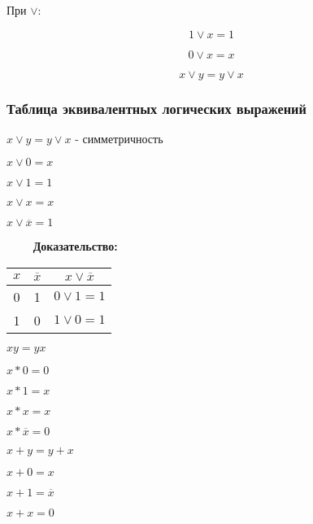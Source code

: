 \documentclass[russian]{lecture-notes}
\begin{document}
\begin{sloppypar}
\begin{proposition*}
        \end{proposition*}

        \begin{proposition*}
            При $\lor$:

            $$1 \lor x = 1$$

            $$0 \lor x = x$$

            $$x \lor y = y \lor x$$
        \end{proposition*}

        \subsubsection{Таблица эквивалентных логических выражений}

        \begin{proposition}
            $x \lor y = y \lor x $ - симметричность


            $x \lor 0 = x$


            $x \lor 1 = 1$


            $x \lor x = x$


            $x \lor \overline{x} = 1 $


            $\qquad$ \textbf{Доказательство:}


            \begin{table}[h!]
                \centering
                \begin{tabular}{|c|c|c|}
                    \hline
                    $x$ & $\overline{x}$ & $x \lor \overline{x}$ \\ \hline
                    0      & 1              & $0 \lor 1 = 1$        \\ \hline
                    1      & 0              & $1 \lor 0 = 1$        \\ \hline
                \end{tabular}
            \end{table}

            $xy = yx $

            $x*0 = 0$

            $x*1 = x$

            $x*x = x$

            $x* \overline{x} = 0$

            $x+y = y + x$

            $x + 0 = x$

            $x + 1 = \overline{x}$

            $x + x = 0$


\end{proposition}
\end{sloppypar}
\end{document}
